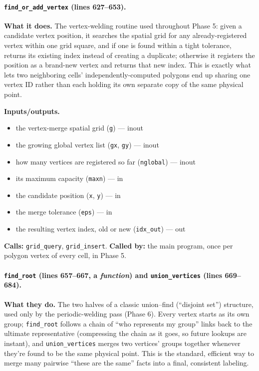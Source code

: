 \documentclass[11pt]{article}
\begin{document}
\paragraph{\texttt{find\_or\_add\_vertex} (lines 627--653).}
\textbf{What it does.} The vertex-welding routine used throughout Phase 5: given a
candidate vertex position, it searches the spatial grid for any already-registered
vertex within one grid square, and if one is found within a tight tolerance, returns
its existing index instead of creating a duplicate; otherwise it registers the position
as a brand-new vertex and returns that new index. This is exactly what lets two
neighboring cells' independently-computed polygons end up sharing one vertex ID rather
than each holding its own separate copy of the same physical point.

\textbf{Inputs/outputs.}
\begin{itemize}[nosep]
  \item the vertex-merge spatial grid (\texttt{g}) --- inout
  \item the growing global vertex list (\texttt{gx}, \texttt{gy}) --- inout
  \item how many vertices are registered so far (\texttt{nglobal}) --- inout
  \item its maximum capacity (\texttt{maxn}) --- in
  \item the candidate position (\texttt{x}, \texttt{y}) --- in
  \item the merge tolerance (\texttt{eps}) --- in
  \item the resulting vertex index, old or new (\texttt{idx\_out}) --- out
\end{itemize}

\textbf{Calls:} \texttt{grid\_query}, \texttt{grid\_insert}. \textbf{Called by:} the
main program, once per polygon vertex of every cell, in Phase 5.

\paragraph{\texttt{find\_root} (lines 657--667, a \emph{function}) and
\texttt{union\_vertices} (lines 669--684).}
\textbf{What they do.} The two halves of a classic union--find (``disjoint set'')
structure, used only by the periodic-welding pass (Phase 6). Every vertex starts as its
own group; \texttt{find\_root} follows a chain of ``who represents my group'' links
back to the ultimate representative (compressing the chain as it goes, so future
lookups are instant), and \texttt{union\_vertices} merges two vertices' groups together
whenever they're found to be the same physical point. This is the standard, efficient
way to merge many pairwise ``these are the same'' facts into a final, consistent
labeling.
\end{document}
